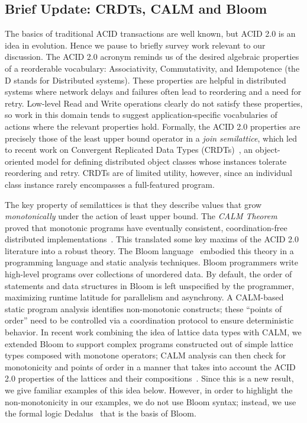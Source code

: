 \documentclass{sig-alternate}
\begin{document}
\subsection{Brief Update: CRDTs, CALM and Bloom}
The basics of traditional ACID transactions are well known, but ACID 2.0 is an
idea in evolution.  Hence we pause to briefly survey work relevant to our discussion.  The ACID 2.0
acronym reminds us of the desired algebraic properties of a reorderable
vocabulary: Associativity, Commutativity, and Idempotence (the D stands for
Distributed systems).  These properties are helpful in distributed systems where
network delays and failures often lead to reordering and a need for
retry. Low-level Read and Write operations clearly do not satisfy these
properties, so work in this domain tends to suggest application-specific
vocabularies of actions where the relevant properties hold.  Formally, the ACID
2.0 properties are precisely those of the least upper bound operator in a \emph{join
  semilattice}, which led to recent work on Convergent Replicated Data Types
(CRDTs)~\cite{Shapiro2011a,Shapiro2011b}, an object-oriented model for defining
distributed object classes whose instances tolerate reordering and retry. CRDTs
are of limited utility, however, since an individual class instance rarely
encompasses a full-featured program.


The key property of semilattices is that they describe values that grow
\emph{monotonically} under the action of least upper bound.  The \emph{CALM
  Theorem} proved that monotonic programs have eventually consistent,
coordination-free distributed
implementations~\cite{Alvaro2011,Ameloot2011,Hellerstein2010}.  This translated some key maxims of the ACID 2.0 literature into a robust theory.  The Bloom language~\cite{Alvaro2011} embodied this theory in a programming language and static analysis techniques. Bloom programmers write high-level programs over collections of unordered data.  By default, the order of statements and data structures in Bloom is left unspecified by the programmer, maximizing runtime latitude for parallelism and asynchrony.  A CALM-based static program analysis identifies non-monotonic constructs; these ``points of order'' need to be controlled via a coordination protocol to ensure deterministic behavior.  In recent work combining the idea of lattice data types with CALM, we extended Bloom to support complex programs constructed out of simple lattice types composed 
with monotone operators; CALM analysis can then check for monotonicity and points of order in a manner that takes into account the ACID 2.0 properties of the lattices and their compositions~\cite{Conway2012}.  Since this is a new result, we give familiar examples of this idea below.  However, in order to highlight the non-monotonicity in our examples, we do not use Bloom syntax; instead, we use the formal logic Dedalus~\cite{dedalus} that is the basis of Bloom.
\end{document}
